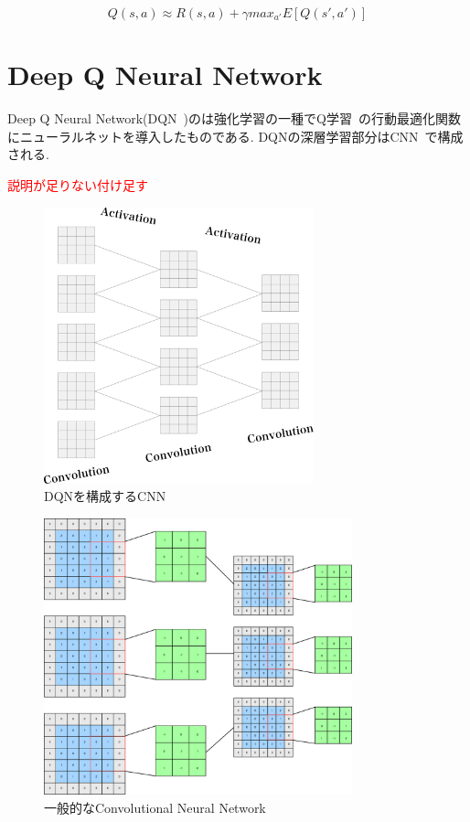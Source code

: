 \begin{equation}
    Q(s, a) \approx R(s, a) + \gamma max_{a'} E[Q(s', a')]
\end{equation}

\section{Deep Q Neural Network}

Deep Q Neural Network(DQN~\cite{DQN})のは強化学習の一種でQ学習~\cite{QL}の行動最適化関数にニューラルネットを導入したものである.
DQNの深層学習部分はCNN~\cite{DQN}で構成される.


\textcolor{red}{説明が足りない付け足す}


\begin{figure}[H]
    \centering
    \includegraphics[clip,height = 8.0cm]{assets/dqn_convolution.eps}
    \caption{DQNを構成するCNN}  \label{DQNCNN}
\end{figure}


\begin{figure}[H]
    \centering
    \includegraphics[clip,height = 8.0cm]{assets/CNN_typical.eps}
    \caption{一般的なConvolutional Neural Network}  \label{CNNTypical}
\end{figure}



